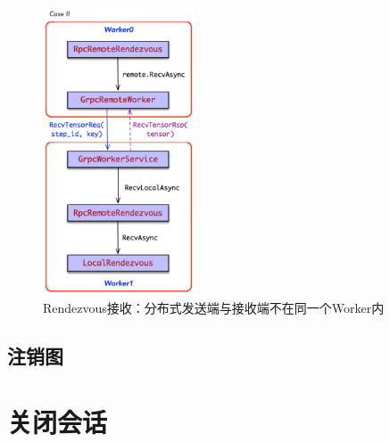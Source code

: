 \begin{content}
\begin{figure}[H]
\centering
\includegraphics[width=0.4\textwidth]{figures/rendezvous-recv-case-2.png}
\caption{Rendezvous接收：分布式发送端与接收端不在同一个Worker内}
 \label{fig:rendezvous-recv-case-2}
\end{figure}

\subsection{注销图}

\end{content}

\section{关闭会话}


